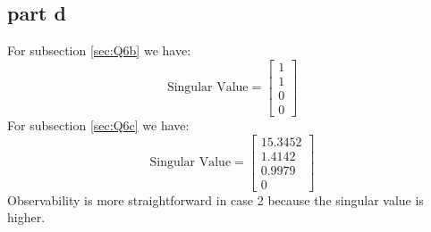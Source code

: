 \subsection{part d}
For subsection \ref{sec:Q6b} we have:
$$
\text{Singular Value} = \begin{bmatrix}
    1\\
    1\\
    0\\
    0
\end{bmatrix}
$$
For subsection \ref{sec:Q6c} we have:
$$
\text{Singular Value} = \begin{bmatrix}
    15.3452\\
    1.4142\\
    0.9979\\
    0
\end{bmatrix}
$$
Observability is more straightforward in case 2 because the singular value is higher.